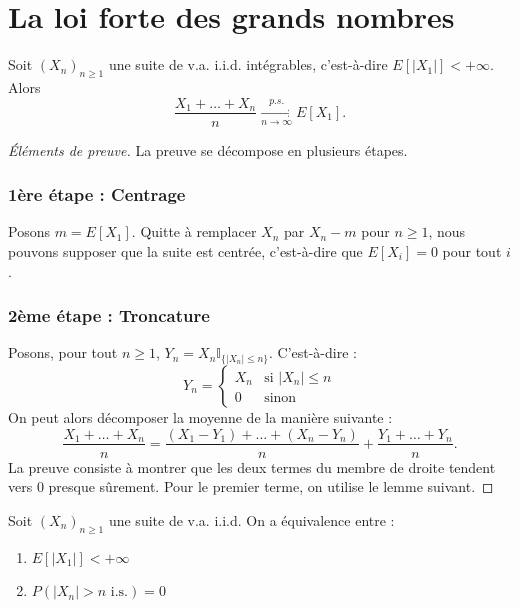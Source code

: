\section{La loi forte des grands nombres}
\begin{theorem}
Soit $(X_n)_{n \ge 1}$ une suite de v.a. i.i.d. intégrables, c'est-à-dire $E[|X_1|] < +\infty$. Alors
\[
\frac{X_1 + \dots + X_n}{n} \xrightarrow[n\to\infty]{p.s.} E[X_1].
\]
\end{theorem}
\begin{proof}[Éléments de preuve]
La preuve se décompose en plusieurs étapes.
\subsubsection*{1ère étape : Centrage}
Posons $m = E[X_1]$. Quitte à remplacer $X_n$ par $X_n - m$ pour $n \ge 1$, nous pouvons supposer que la suite est centrée, c'est-à-dire que $E[X_i] = 0$ pour tout $i$.
\subsubsection*{2ème étape : Troncature}
Posons, pour tout $n \ge 1$, $Y_n = X_n \mathbb{I}_{\{|X_n| \le n\}}$. C'est-à-dire :
\[ Y_n = \begin{cases} X_n & \text{si } |X_n| \le n \\ 0 & \text{sinon} \end{cases} \]
On peut alors décomposer la moyenne de la manière suivante :
\[
\frac{X_1 + \dots + X_n}{n} = \frac{(X_1 - Y_1) + \dots + (X_n - Y_n)}{n} + \frac{Y_1 + \dots + Y_n}{n}.
\]
La preuve consiste à montrer que les deux termes du membre de droite tendent vers 0 presque sûrement. Pour le premier terme, on utilise le lemme suivant.
\end{proof}
\begin{lemma}
Soit $(X_n)_{n \ge 1}$ une suite de v.a. i.i.d. On a équivalence entre :
\begin{enumerate}
    \item[i)] $E[|X_1|] < +\infty$
    \item[ii)] $P(|X_n| > n \text{ i.s.}) = 0$
\end{enumerate}
\end{lemma}
